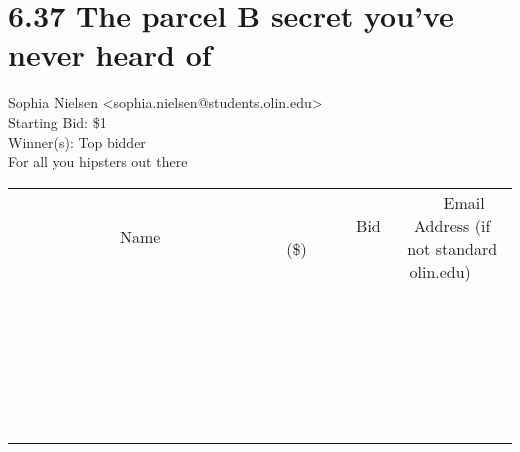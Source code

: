 \documentclass[11pt]{article}
\begin{document}
					\section*{6.37 The parcel B secret you’ve never heard of}
					Sophia Nielsen <sophia.nielsen@students.olin.edu> \\
					Starting Bid: \$1 \\
					Winner(s): Top bidder \\
					For all you hipsters out there \\
					[6ex]
					\begin{tabular}{c c c}
						~~~~~~~~~~~~~Name~~~~~~~~~~~~~ & ~~~~~~~~~Bid (\$)~~~~~~~~~ & ~~~Email Address (if not standard olin.edu)~~~ \\
				
 & & \\
\hline
 & & \\
\hline
 & & \\
\hline
 & & \\
\hline
 & & \\
\hline
 & & \\
\hline
 & & \\
\hline
 & & \\
\hline
 & & \\
\hline
 & & \\
\hline
 & & \\
\hline
 & & \\
\hline
 & & \\
\hline
 & & \\
\hline
 & & \\
\hline
 & & \\
\hline
 & & \\
\hline
 & & \\
\hline
 & & \\
\hline
 & & \\
\hline
 & & \\
\hline
 & & \\
\hline
 & & \\
\hline
 & & \\
\hline
 & & \\
\hline
 & & \\
\hline
					\end{tabular}
					\clearpage
				
\end{document}
